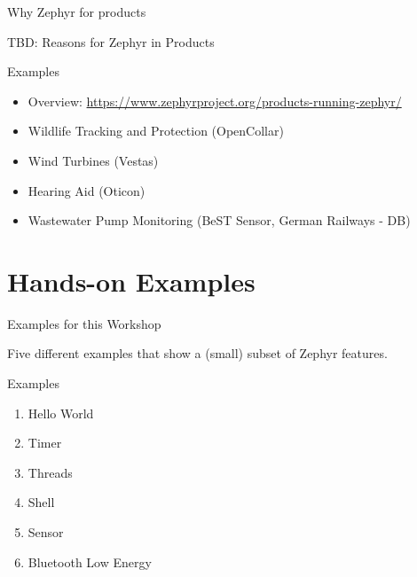 \documentclass[10pt, aspectratio=169]{beamer}
\begin{document}
\begin{frame}[fragile]{Why Zephyr for products}

    TBD: Reasons for Zephyr in Products

  \begin{block}{Examples}
    \begin{itemize}
       \item Overview: {\scriptsize \url{https://www.zephyrproject.org/products-running-zephyr/}}
       \item Wildlife Tracking and Protection (OpenCollar)
       \item Wind Turbines (Vestas)
       \item Hearing Aid (Oticon)
       \item Wastewater Pump Monitoring (BeST Sensor, German Railways - DB)
    \end{itemize}
  \end{block}
\end{frame}

\section{Hands-on Examples}

\begin{frame}[fragile]{Examples for this Workshop}

  Five different examples that show a (small) subset of Zephyr features.

  \begin{block}{Examples}
    \begin{enumerate}
       \item Hello World
       \item Timer
       \item Threads
       \item Shell
       \item Sensor
       \item Bluetooth Low Energy
    \end{enumerate}
  \end{block}
\end{frame}
\end{document}
